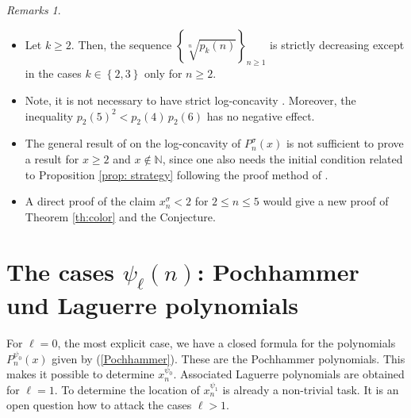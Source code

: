 \documentclass[11pt,reqno]{amsart}
\theoremstyle{plain}
\theoremstyle{remark}
\newtheorem*{remarks*}{Remarks}
\theoremstyle{definition}
\numberwithin{equation}{section}
\begin{document}
\begin{remarks*}\
\begin{itemize}
\item[(i)] Let $k \geq 2$. Then, the sequence $
\left\{ \sqrt[n]{p_{k}\left( n\right) }\right\}
_{n\geq 1}$ is strictly decreasing
except in the cases $k\in \left\{ 2,3\right\} $ only
for $n\geq 2$. 
\item[(ii)] Note, it is not necessary to have strict log-concavity
\cite{BKPR25}. Moreover, the inequality 
$p_2(5)^2 < p_2(4) \, p_2(6)$ has no negative effect. 
\item[(iii)] The general result of \cite{BKRT21} on the log-concavity of $P_n^{\sigma}(x)$ is not sufficient to prove a result for $x \geq 2$ and $x \not\in \mathbb{N}$, since one also needs the initial condition related to
Proposition \ref{prop: strategy} following the proof method of \cite{WZ14}.
\item[(iv)] A direct proof of the claim $x_n^{\sigma}<2
$ for
$2\leq n \leq 5
$ would give a new proof of Theorem \ref{th:color} and the Conjecture.
\end{itemize}
\end{remarks*}






\section{The
cases $\psi_{\ell}(n)$: Pochhammer und Laguerre polynomials}
\label{sect:poch}
For $\ell=0$, the most explicit case, we have a closed formula for
the polynomials $P_n^{\psi_0}\left( x\right)
$ given by (\ref{Pochhammer}). 
These are the Pochhammer polynomials.
This makes it possible to determine $x_n^{\psi_0}$. Associated Laguerre polynomials are obtained for $\ell=1$. To determine the location of
$x_n^{\psi_1}$ is already a non-trivial task. It is an open question how to
attack the cases $\ell>1$.
\end{document}
